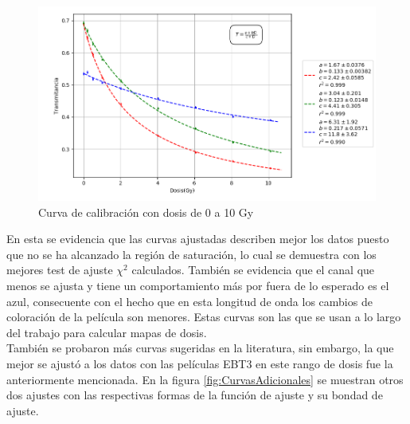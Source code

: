 \begin{figure}[H]
	\centering
	\includegraphics[width=\linewidth]{images/calibracionMulti.png}
	\caption{Curva de calibración con dosis de 0 a 10 Gy }
	\label{fig:curvaFinal}
\end{figure}

En esta se evidencia que las curvas ajustadas describen mejor los datos puesto que no se ha alcanzado la región de saturación, lo cual se demuestra con los mejores test de ajuste $\chi ^2$ calculados. También se evidencia que el canal que menos se ajusta y tiene un comportamiento más por fuera de lo esperado es el azul, consecuente con el hecho que en esta longitud de onda los cambios de coloración de la película son menores. Estas curvas son las que se usan a lo largo del trabajo para calcular mapas de dosis.\\

También se probaron más curvas sugeridas en la literatura, sin embargo, la que mejor se ajustó a los datos con las películas EBT3 en este rango de dosis fue la anteriormente mencionada. En la figura \ref{fig:CurvasAdicionales} se muestran otros dos ajustes con las respectivas formas de la función de ajuste y su bondad de ajuste.


